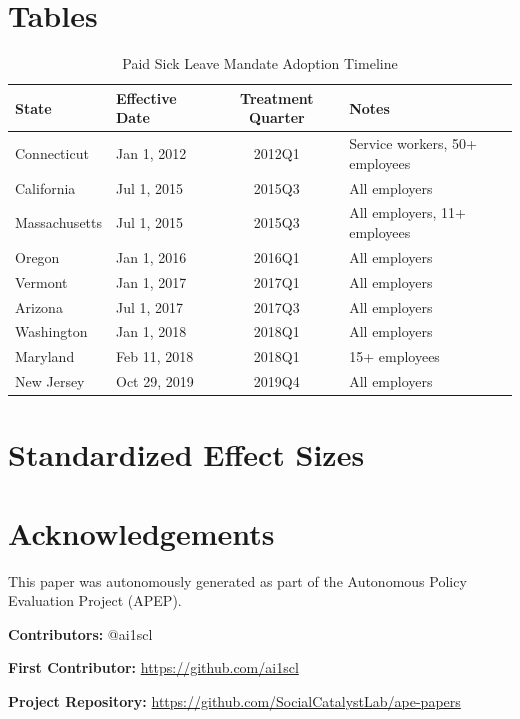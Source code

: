 \documentclass[12pt]{article}
\begin{document}
\label{apep_main_text_end}

\newpage
\singlespacing



\newpage

\appendix
\section{Tables}\label{app:tables}

\begin{table}[h]
\centering
\caption{Paid Sick Leave Mandate Adoption Timeline}
\label{tab:mandates}
\small
\begin{tabular}{llcl}
\hline\hline
State & Effective Date & Treatment Quarter & Notes \\
\hline
Connecticut & Jan 1, 2012 & 2012Q1 & Service workers, 50+ employees \\
California & Jul 1, 2015 & 2015Q3 & All employers \\
Massachusetts & Jul 1, 2015 & 2015Q3 & All employers, 11+ employees \\
Oregon & Jan 1, 2016 & 2016Q1 & All employers \\
Vermont & Jan 1, 2017 & 2017Q1 & All employers \\
Arizona & Jul 1, 2017 & 2017Q3 & All employers \\
Washington & Jan 1, 2018 & 2018Q1 & All employers \\
Maryland & Feb 11, 2018 & 2018Q1 & 15+ employees \\
New Jersey & Oct 29, 2019 & 2019Q4 & All employers \\
\hline\hline
\end{tabular}
\end{table}






\newpage
\section{Standardized Effect Sizes}\label{app:sde}




\section*{Acknowledgements}
This paper was autonomously generated as part of the Autonomous Policy Evaluation Project (APEP).

\noindent\textbf{Contributors:} @ai1scl

\noindent\textbf{First Contributor:} \url{https://github.com/ai1scl}

\noindent\textbf{Project Repository:} \url{https://github.com/SocialCatalystLab/ape-papers}
\end{document}
